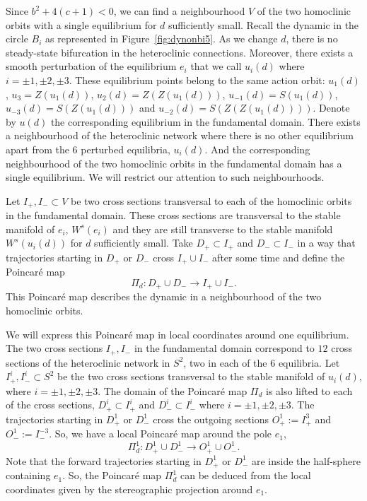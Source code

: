 \documentclass{article}
\theoremstyle{definition}
\begin{document}
Since $b^2+4(c+1)<0$, we can find a neighbourhood $V$ of the two homoclinic orbits with a single equilibrium for $d$ sufficiently small.
Recall the dynamic in the circle $B_i$ as represented in Figure~\ref{fig:dynonbi5}. 
As we change $d$, there is no steady-state bifurcation in the heteroclinic connections. 
Moreover, there exists a smooth perturbation of the equilibrium $e_i$ that we call $u_i(d)$ where $i=\pm1, \pm 2, \pm 3$.
These equilibrium points belong to the same action orbit: $u_1(d)$, $u_3=Z(u_1(d))$, $u_2(d)=Z(Z(u_1(d)))$, $u_{-1}(d)=S(u_1(d))$, $u_{-3}(d)=S(Z(u_1(d)))$ and $u_{-2}(d)=S(Z(Z(u_1(d))))$.
Denote by $u(d)$ the corresponding equilibrium in the fundamental domain.
There exists a neighbourhood of the heteroclinic network where there is no other equilibrium apart from the $6$ perturbed equilibria, $u_{i}(d)$.
And the corresponding neighbourhood of the two homoclinic orbits in the fundamental domain has a single equilibrium. 
We will restrict our attention to such neighbourhoods.

Let $I_{+}, I_{-}\subset V$ be two cross sections transversal to each of the homoclinic orbits in the fundamental domain.
These cross sections are transversal to the stable manifold of $e_i$, $W^s(e_i)$ and they are still transverse to the stable manifold $W^s(u_i(d))$ for $d$ sufficiently small.
Take $D_{+}\subset I_{+}$ and $D_{-}\subset I_{-}$ in a way that trajectories starting in $D_+$ or $D_-$ cross $I_{+}\cup I_{-}$ after some time and define the Poincaré map $$\Pi_d:D_+\cup D_-\to I_{+}\cup I_{-}.$$
This Poincaré map describes the dynamic in a neighbourhood of the two homoclinic orbits.

We will express this Poincaré map in local coordinates around one equilibrium.
The two cross sections $I_{+}, I_{-}$ in the fundamental domain correspond to $12$ cross sections of the heteroclinic network in $S^2$, two in each of the $6$ equilibria.
Let $I^i_{+}, I^i_{-}\subset S^2$ be the two cross sections transversal to the stable manifold of $u_i(d)$, where $i= \pm 1, \pm 2, \pm 3$. 
The domain of the Poincaré map $\Pi_d$ is also lifted to each of the cross sections, $D^i_{+}\subset I^i_{+}$ and $D^i_{-}\subset I^i_{-}$ where $i=\pm1, \pm 2, \pm 3$.
The trajectories starting in $D^1_+$ or $D^1_-$ cross the outgoing sections $O^1_+:=I^{3}_{+}$ and $O^1 _-:= I^{-3}_{-}$.
So, we have a local Poincaré map around the pole $e_1$, $$\Pi^1_d: D^1_+\cup D^1_-\to O^1_{+}\cup O^1_{-}.$$
Note that the forward trajectories starting in $D^1_+$ or $D^1_-$ are inside the half-sphere containing $e_1$.
So, the Poincaré map $\Pi^1_d$ can be deduced from the local coordinates given by the stereographic projection around $e_1$.
\end{document}
